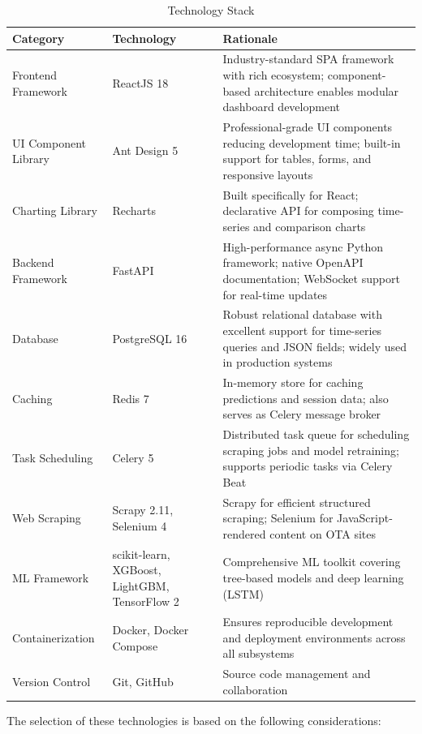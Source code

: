 \documentclass[12pt,a4paper]{report}
\begin{document}
\begin{longtable}{|p{3.8cm}|p{4.2cm}|p{7cm}|}
\caption{Technology Stack}
\label{tab:tech_stack} \\
\hline
\textbf{Category} & \textbf{Technology} & \textbf{Rationale} \\
\hline
\endfirsthead
\endhead
\hline
\endfoot
\hline
\endlastfoot
Frontend Framework & ReactJS 18 & Industry-standard SPA framework with rich ecosystem; component-based architecture enables modular dashboard development \\
\hline
UI Component Library & Ant Design 5 & Professional-grade UI components reducing development time; built-in support for tables, forms, and responsive layouts \\
\hline
Charting Library & Recharts & Built specifically for React; declarative API for composing time-series and comparison charts \\
\hline
Backend Framework & FastAPI & High-performance async Python framework; native OpenAPI documentation; WebSocket support for real-time updates \\
\hline
Database & PostgreSQL 16 & Robust relational database with excellent support for time-series queries and JSON fields; widely used in production systems \\
\hline
Caching & Redis 7 & In-memory store for caching predictions and session data; also serves as Celery message broker \\
\hline
Task Scheduling & Celery 5 & Distributed task queue for scheduling scraping jobs and model retraining; supports periodic tasks via Celery Beat \\
\hline
Web Scraping & Scrapy 2.11, Selenium 4 & Scrapy for efficient structured scraping; Selenium for JavaScript-rendered content on OTA sites \\
\hline
ML Framework & scikit-learn, XGBoost, LightGBM, TensorFlow 2 & Comprehensive ML toolkit covering tree-based models and deep learning (LSTM) \\
\hline
Containerization & Docker, Docker Compose & Ensures reproducible development and deployment environments across all subsystems \\
\hline
Version Control & Git, GitHub & Source code management and collaboration \\
\hline
\end{longtable}

The selection of these technologies is based on the following considerations:
\end{document}
